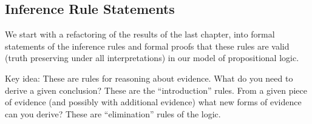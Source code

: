 \documentclass[letterpaper,10pt,english]{sphinxmanual}
\begin{document}
\subsection{Inference Rule Statements}
\label{\detokenize{A_01_Propositional_Logic:inference-rule-statements}}
\sphinxAtStartPar
We start with a refactoring of the results of the last
chapter, into formal statements of the inference rules
and formal proofs that these rules are valid (truth\sphinxhyphen{}
preserving under all interpretations) in our model of
propositional logic.

\sphinxAtStartPar
Key idea: These are rules for reasoning about evidence.
What  do you need to derive a given conclusion?
These are the “introduction” rules. From a given piece of
evidence (and possibly with additional evidence) what new
forms of evidence can you derive? These are “elimination”
rules of the logic.
\end{document}
